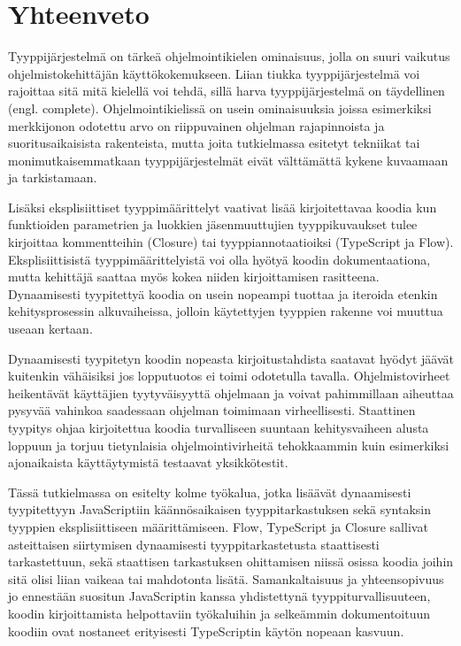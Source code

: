 \chapter{Yhteenveto}

Tyyppijärjestelmä on tärkeä ohjelmointikielen ominaisuus, jolla on suuri
vaikutus ohjelmistokehittäjän käyttökokemukseen.
Liian tiukka tyyppijärjestelmä voi rajoittaa sitä mitä kielellä voi tehdä,
sillä harva tyyppijärjestelmä on täydellinen (engl. complete).
Ohjelmointikielissä on usein ominaisuuksia joissa esimerkiksi merkkijonon
odotettu arvo on riippuvainen ohjelman rajapinnoista ja suoritusaikaisista
rakenteista, mutta joita tutkielmassa esitetyt tekniikat tai
monimutkaisemmatkaan tyyppijärjestelmät eivät välttämättä kykene
kuvaamaan ja tarkistamaan.

Lisäksi eksplisiittiset tyyppimäärittelyt vaativat lisää kirjoitettavaa
koodia kun funktioiden parametrien ja luokkien jäsenmuuttujien tyyppikuvaukset
tulee kirjoittaa kommentteihin (Closure) tai tyyppiannotaatioiksi
(TypeScript ja Flow).
Eksplisiittisistä tyyppimäärittelyistä voi olla hyötyä
koodin dokumentaationa, mutta kehittäjä saattaa myös kokea niiden
kirjoittamisen rasitteena. Dynaamisesti tyypitettyä koodia on usein
nopeampi tuottaa ja iteroida etenkin kehitysprosessin alkuvaiheissa, jolloin
käytettyjen tyyppien rakenne voi muuttua useaan kertaan. 

Dynaamisesti tyypitetyn koodin nopeasta kirjoitustahdista saatavat hyödyt jäävät kuitenkin
vähäisiksi jos lopputuotos ei toimi odotetulla tavalla. Ohjelmistovirheet heikentävät
käyttäjien tyytyväisyyttä ohjelmaan ja voivat pahimmillaan aiheuttaa
pysyvää vahinkoa saadessaan ohjelman toimimaan virheellisesti.
Staattinen tyypitys ohjaa kirjoitettua koodia turvalliseen suuntaan kehitysvaiheen alusta
loppuun ja torjuu tietynlaisia ohjelmointivirheitä tehokkaammin kuin
esimerkiksi ajonaikaista käyttäytymistä testaavat yksikkötestit.

Tässä tutkielmassa on esitelty kolme työkalua, jotka lisäävät dynaamisesti
tyypitettyyn JavaScriptiin käännösaikaisen tyyppitarkastuksen sekä syntaksin
tyyppien eksplisiittiseen määrittämiseen. Flow, TypeScript ja Closure
sallivat asteittaisen siirtymisen dynaamisesti tyyppitarkastetusta staattisesti
tarkastettuun, sekä staattisen tarkastuksen ohittamisen niissä osissa koodia
joihin sitä olisi liian vaikeaa tai mahdotonta lisätä.
Samankaltaisuus ja yhteensopivuus jo ennestään suositun JavaScriptin kanssa
yhdistettynä tyyppiturvallisuuteen, koodin kirjoittamista helpottaviin
työkaluihin ja selkeämmin dokumentoituun koodiin ovat nostaneet erityisesti
TypeScriptin käytön nopeaan kasvuun.
